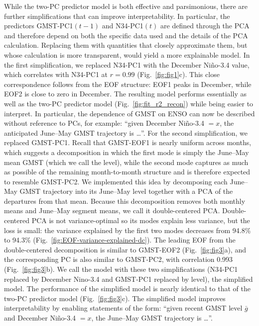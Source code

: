 \documentclass[draft]{agujournal2019}
\begin{document}
While the two-PC predictor model is both effective and
    parsimonious, there are further simplifications that can improve
    interpretability. In particular, the predictors GMST-PC1$(t-1)$ and N34-PC1$(t)$
    are defined through the PCA and therefore depend on both the
    specific data used and the details of the PCA
    calculation. Replacing them with quantities that closely
    approximate them, but whose calculation is more transparent, would
    yield a more explainable model. In the first simplification, we replaced N34-PC1 with the
    December Niño-3.4 value, which correlates with N34-PC1 at $r=0.99$
    (Fig.\ \ref{fig:fig1}c). This close correspondence follows from
    the EOF structure: EOF1 peaks in December, while EOF2 is close to
    zero in December. The resulting model performs essentially as well as the two-PC
    predictor model (Fig.\ \ref{fig:fit_r2_recon}) while being easier
    to interpret. In particular, the dependence of GMST on ENSO can
    now be described without reference to PCs, for example: ``given
    December Niño-3.4 $=x$, the anticipated June--May GMST trajectory
    is \ldots''. For the second simplification, we replaced GMST-PC1. Recall
    that GMST-EOF1 is nearly uniform across months, which suggests a
    decomposition in which the first mode is simply the June--May mean
    GMST (which we call the level), while the second mode captures as
    much as possible of the remaining month-to-month structure and is
    therefore expected to resemble GMST-PC2. We implemented this idea by decomposing each June--May GMST
    trajectory into its June--May level together with a PCA of the
    departures from that mean. Because this decomposition removes both
    monthly means and June--May segment means, we call it
    double-centered PCA. Double-centered PCA is not variance-optimal so its modes
    explain less variance, but the loss is small: the variance
    explained by the first two modes decreases from 94.8\% to 94.3\%
    (Fig.\ \ref{fig:EOF-variance-explained-dc}). The leading EOF from
    the double-centered decomposition is similar to GMST-EOF2 (Fig.\
    \ref{fig:fig3}a), and the corresponding PC is also similar to
    GMST-PC2, with correlation 0.993 (Fig.\ \ref{fig:fig3}b). We call the model with these two simplifications (N34-PC1
    replaced by December Nino-3.4 and GMST-PC1 replaced by level), the
    simplified model. The performance of the  simplified model is nearly
    identical to that of the two-PC predictor model (Fig.\
    \ref{fig:fig3}c). The simplified model improves interpretability by enabling
    statements of the form: ``given recent GMST level $\bar{g}$ and
    December Niño-3.4 $=x$, the June--May GMST trajectory is \ldots''.
\end{document}
